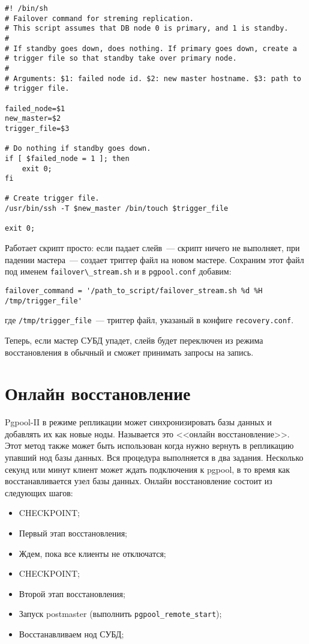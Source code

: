 \begin{lstlisting}[label=lst:pgpool40,caption=Скрипт выполняется при падении нода PostgreSQL]
#! /bin/sh
# Failover command for streming replication.
# This script assumes that DB node 0 is primary, and 1 is standby.
#
# If standby goes down, does nothing. If primary goes down, create a
# trigger file so that standby take over primary node.
#
# Arguments: $1: failed node id. $2: new master hostname. $3: path to
# trigger file.

failed_node=$1
new_master=$2
trigger_file=$3

# Do nothing if standby goes down.
if [ $failed_node = 1 ]; then
	exit 0;
fi

# Create trigger file.
/usr/bin/ssh -T $new_master /bin/touch $trigger_file

exit 0;
\end{lstlisting}

Работает скрипт просто: если падает слейв~--- скрипт ничего не выполняет, при падении мастера~--- создает триггер файл на новом мастере. Сохраним этот файл под именем \lstinline!failover\_stream.sh! и в \lstinline!pgpool.conf! добавим:

\begin{lstlisting}[label=lst:pgpool41,caption=Что выполнять при падении нода]
failover_command = '/path_to_script/failover_stream.sh %d %H /tmp/trigger_file'
\end{lstlisting}

где \lstinline!/tmp/trigger_file!~--- триггер файл, указаный в конфиге \lstinline!recovery.conf!.

Теперь, если мастер СУБД упадет, слейв будет переключен из режима восстановления в обычный и сможет принимать запросы на запись.



\section{Онлайн восстановление}

Pgpool-II в режиме репликации может синхронизировать базы данных и добавлять их как новые ноды. Называется это <<онлайн восстановление>>. Этот метод также может быть использован когда нужно вернуть в репликацию упавший нод базы данных. Вся процедура выполняется в два задания. Несколько секунд или минут клиент может ждать подключения к pgpool, в то время как восстанавливается узел базы данных. Онлайн восстановление состоит из следующих шагов:

\begin{itemize}
  \item CHECKPOINT;
  \item Первый этап восстановления;
  \item Ждем, пока все клиенты не отключатся;
  \item CHECKPOINT;
  \item Второй этап восстановления;
  \item Запуск postmaster (выполнить \lstinline!pgpool_remote_start!);
  \item Восстанавливаем нод СУБД;
\end{itemize}

